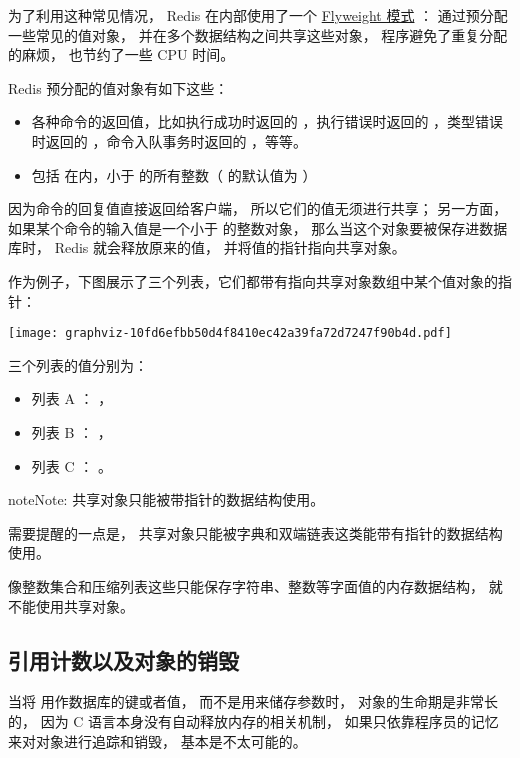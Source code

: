 \documentclass[a4paper,11pt,english]{sphinxmanual}
\begin{document}
为了利用这种常见情况，
Redis 在内部使用了一个 \href{http://en.wikipedia.org/wiki/Flyweight\_pattern}{Flyweight 模式} ：
通过预分配一些常见的值对象，
并在多个数据结构之间共享这些对象，
程序避免了重复分配的麻烦，
也节约了一些 CPU 时间。

Redis 预分配的值对象有如下这些：
\begin{itemize}
\item {} 
各种命令的返回值，比如执行成功时返回的  ，执行错误时返回的  ，类型错误时返回的  ，命令入队事务时返回的  ，等等。

\item {} 
包括  在内，小于  的所有整数（ 的默认值为 ）

\end{itemize}

因为命令的回复值直接返回给客户端，
所以它们的值无须进行共享；
另一方面，
如果某个命令的输入值是一个小于  的整数对象，
那么当这个对象要被保存进数据库时，
Redis 就会释放原来的值，
并将值的指针指向共享对象。

作为例子，下图展示了三个列表，它们都带有指向共享对象数组中某个值对象的指针：

\texttt{[image: graphviz-10fd6efbb50d4f8410ec42a39fa72d7247f90b4d.pdf]}

三个列表的值分别为：
\begin{itemize}
\item {} 
列表 A ： \code{{[}20130101, 300, 10086{]}} ，

\item {} 
列表 B ： \code{{[}81, 12345678910, 999{]}} ，

\item {} 
列表 C ： \code{{[}100, 0, -25, 123{]}} 。

\end{itemize}

\begin{notice}{note}{Note:}
共享对象只能被带指针的数据结构使用。

需要提醒的一点是，
共享对象只能被字典和双端链表这类能带有指针的数据结构使用。

像整数集合和压缩列表这些只能保存字符串、整数等字面值的内存数据结构，
就不能使用共享对象。
\end{notice}


\subsection{引用计数以及对象的销毁}
\label{datatype/object:id4}
当将  用作数据库的键或者值，
而不是用来储存参数时，
对象的生命期是非常长的，
因为 C 语言本身没有自动释放内存的相关机制，
如果只依靠程序员的记忆来对对象进行追踪和销毁，
基本是不太可能的。
\end{document}
